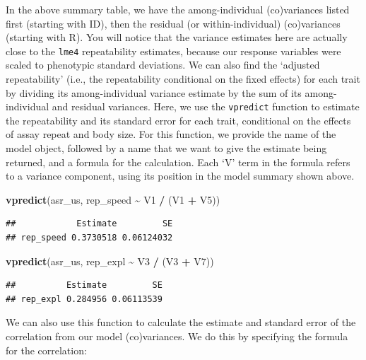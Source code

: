 \documentclass[
  12pt,
]{book}
\newenvironment{Shaded}{\begin{snugshade}}{\end{snugshade}}
\newcommand{\KeywordTok}[1]{\textcolor[rgb]{0.13,0.29,0.53}{\textbf{#1}}}
\newcommand{\NormalTok}[1]{#1}
\newcommand{\OperatorTok}[1]{\textcolor[rgb]{0.81,0.36,0.00}{\textbf{#1}}}
\newcommand{\StringTok}[1]{\textcolor[rgb]{0.31,0.60,0.02}{#1}}
\begin{document}
In the above summary table, we have the among-individual (co)variances listed first (starting with ID), then the residual (or within-individual) (co)variances (starting with R). You will notice that the variance estimates here are actually close to the \texttt{lme4} repeatability estimates, because our response variables were scaled to phenotypic standard deviations. We can also find the `adjusted repeatability' (i.e., the repeatability conditional on the fixed effects) for each trait by dividing its among-individual variance estimate by the sum
of its among-individual and residual variances.
Here, we use the \texttt{vpredict} function to estimate the repeatability and its
standard error for each trait, conditional on the effects of assay repeat and body size.
For this function, we provide the name of the model object, followed by a name that we want to give the estimate being returned, and a formula for the calculation. Each `V' term in the formula refers to a variance component, using its position in the model summary shown above.

\begin{Shaded}
\begin{Highlighting}[]
\KeywordTok{vpredict}\NormalTok{(asr\_us, rep\_speed }\OperatorTok{\textasciitilde{}}\StringTok{ }\NormalTok{V1 }\OperatorTok{/}\StringTok{ }\NormalTok{(V1 }\OperatorTok{+}\StringTok{ }\NormalTok{V5))}
\end{Highlighting}
\end{Shaded}

\begin{verbatim}
##            Estimate         SE
## rep_speed 0.3730518 0.06124032
\end{verbatim}

\begin{Shaded}
\begin{Highlighting}[]
\KeywordTok{vpredict}\NormalTok{(asr\_us, rep\_expl }\OperatorTok{\textasciitilde{}}\StringTok{ }\NormalTok{V3 }\OperatorTok{/}\StringTok{ }\NormalTok{(V3 }\OperatorTok{+}\StringTok{ }\NormalTok{V7))}
\end{Highlighting}
\end{Shaded}

\begin{verbatim}
##          Estimate         SE
## rep_expl 0.284956 0.06113539
\end{verbatim}

We can also use this function to calculate the estimate and standard error of the correlation from our model (co)variances. We do this by specifying the formula for the correlation:
\end{document}

